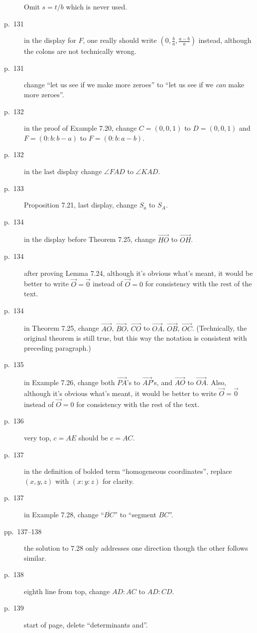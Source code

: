 \documentclass[11pt]{scrartcl}
\begin{document}
\begin{description}
  Omit $s=t/b$ which is never used.
\item[p.\  131] in the display for $F$, one really should write $(0, \frac ba, \frac{a-b}{a})$ instead,
  although the colons are not technically wrong.
\item[p.\  131] change ``let us see if we make more zeroes''
  to ``let us see if we \emph{can} make more zeroes''.
\item[p.\  132] in the proof of Example 7.20, change $C = (0, 0, 1)$ to $D = (0, 0, 1)$
  and $F = (0 : b : b - a)$ to $F = (0 : b : a - b)$.
\item[p.\  132] in the last display change $\angle FAD$ to $\angle KAD$.
\item[p.\  133] Proposition 7.21, last display, change $S_a$ to $S_A$.
\item[p.\  134] in the display before Theorem 7.25,
  change $\overrightarrow{HO}$ to $\overrightarrow{OH}$.
\item[p.\  134] after proving Lemma 7.24,
  although it's obvious what's meant, it would be better to write $\vec O = \vec 0$
  instead of $\vec O = 0$ for consistency with the rest of the text.
\item[p.\  134] in Theorem 7.25, change
  $\overrightarrow{AO}$, $\overrightarrow{BO}$, $\overrightarrow{CO}$ to
  $\overrightarrow{OA}$, $\overrightarrow{OB}$, $\overrightarrow{OC}$.
  (Technically, the original theorem is still true,
  but this way the notation is consistent with preceding paragraph.)
\item[p.\  135] in Example 7.26, change both $\overrightarrow{PA}$'s to $\overrightarrow{AP}$'s,
  and $\overrightarrow{AO}$ to $\overrightarrow{OA}$.
  Also, although it's obvious what's meant, it would be better to write $\vec O = \vec 0$
  instead of $\vec O = 0$ for consistency with the rest of the text.
\item[p.\  136] very top, $c=AE$ should be $c=AC$.
\item[p.\  137] in the definition of bolded term ``homogeneous coordinates'',
  replace $(x,y,z)$ with $(x:y:z)$ for clarity.
\item[p.\  137] in Example 7.28, change ``$\overline{BC}$'' to ``segment $BC$''.
\item[pp.\  137--138] the solution to 7.28 only addresses one direction
  though the other follows similar.
\item[p.\  138] eighth line from top, change $AD:AC$ to $AD:CD$.
\item[p.\  139] start of page, delete ``determinants and''.

\end{description}
\end{document}
